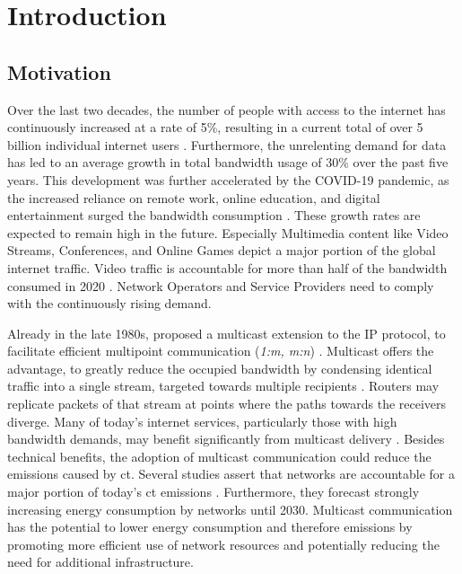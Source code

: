 \chapter{Introduction} %
\label{chap:Introduction}


\section{Motivation} %
\label{sec:Motivation}


Over the last two decades, the number of people with access to the internet has
    continuously increased at a rate of 5\%, resulting in a current total of
    over 5 billion individual internet users \cite{itu_digdev}.
Furthermore, the unrelenting demand for data has led to an average growth in
    total bandwidth usage of 30\% over the past five years.
This development was further accelerated by the COVID-19 pandemic, as the
    increased reliance on remote work, online education, and digital
    entertainment surged the bandwidth consumption \cite{cartesian_us_bw}.
These growth rates are expected to remain high in the future.
Especially Multimedia content like Video Streams, Conferences, and Online Games
    depict a major portion of the global internet traffic.
Video traffic is accountable for more than half of the bandwidth consumed in
    2020 \cite{cartesian_us_bw}.
Network Operators and Service Providers need to comply with the continuously
    rising demand.

Already in the late 1980s, \citeauthor{deering1990multicast} proposed a
    multicast extension to the IP protocol, to facilitate efficient multipoint
    communication (\textit{1:m, m:n})
    \cite{deering1990multicast, rfc1112_ipmc}.
Multicast offers the advantage, to greatly reduce the occupied bandwidth by
    condensing identical traffic into a single stream, targeted towards
    multiple recipients \cite{rfc3376_igmp}.
Routers may replicate packets of that stream at points where the paths towards 
    the receivers diverge.
Many of today's internet services, particularly those with high bandwidth
    demands, may benefit significantly from multicast delivery
    \cite{ratnasamy2006revisiting, meadcast1}.
Besides technical benefits, the adoption of multicast communication could
    reduce the emissions caused by \gls{ct}.
Several studies assert that networks are accountable for a major portion of
    today's \gls{ct} emissions \cite{andrae2015global}.
Furthermore, they forecast strongly increasing energy consumption by networks
    until 2030.
Multicast communication has the potential to lower energy consumption and
    therefore emissions by promoting more efficient use of network resources
    and potentially reducing the need for additional infrastructure.


